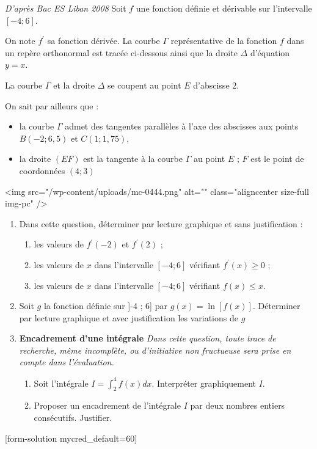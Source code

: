 
%
\textit{D'après Bac ES Liban 2008}
Soit $f$ une fonction définie et dérivable sur l'intervalle $\left[-4 ; 6\right]$.
\par
On note $f^{\prime}$ sa fonction dérivée. La courbe $\Gamma $ représentative de la fonction $f$ dans un repère orthonormal est tracée ci-dessous ainsi que la droite $\Delta $ d'équation $y=x$.
\par
La courbe $\Gamma $ et la droite $\Delta $ se coupent au point $E$ d'abscisse $2$.
\par
On sait par ailleurs que :
\begin{itemize}
     \item
     la courbe $\Gamma $ admet des tangentes parallèles à l'axe des abscisses aux points $B \left(-2 ; 6,5\right)$ et $C\left(1 ; 1,75\right)$,
     \item
     la droite $\left(EF\right)$ est la tangente à la courbe $\Gamma $ au point $E$ ; $F$ est le point de coordonnées $\left(4 ; 3\right)$
\end{itemize}
<img src="/wp-content/uploads/mc-0444.png" alt="" class="aligncenter size-full  img-pc" />
\begin{enumerate}
     \item
     Dans cette question, déterminer par lecture graphique et sans justification :
     \begin{enumerate}
          \item
          les valeurs de $f^{\prime}\left(-2\right)$ et $f^{\prime}\left(2\right)$ ;
          \item
          les valeurs de $x$ dans l'intervalle $\left[-4 ; 6\right]$ vérifiant $f^{\prime}\left(x\right)\geqslant 0$ ;
          \item
          les valeurs de $x$ dans l'intervalle $\left[-4 ; 6\right]$ vérifiant $f\left(x\right) \leqslant x$.
     \end{enumerate}
     \item
     Soit $g$ la fonction définie sur ]-4 ; 6] par $g\left(x\right)=\ln\left[f\left(x\right)\right]$. Déterminer par lecture graphique et avec justification les variations de $g$
     \item
     \textbf{Encadrement d'une intégrale}
     \textit{Dans cette question, toute trace de recherche, même incomplète, ou d'initiative non fructueuse sera prise en compte dans l'évaluation.}
     \begin{enumerate}
          \item
          Soit l'intégrale $I=\int_{ 2}^{ 4} f\left(x\right) dx$. Interpréter graphiquement $I$.
          \item
          Proposer un encadrement de l'intégrale $I$ par deux nombres entiers consécutifs. Justifier.
     \end{enumerate}
\end{enumerate}
[form-solution mycred_default=60]
